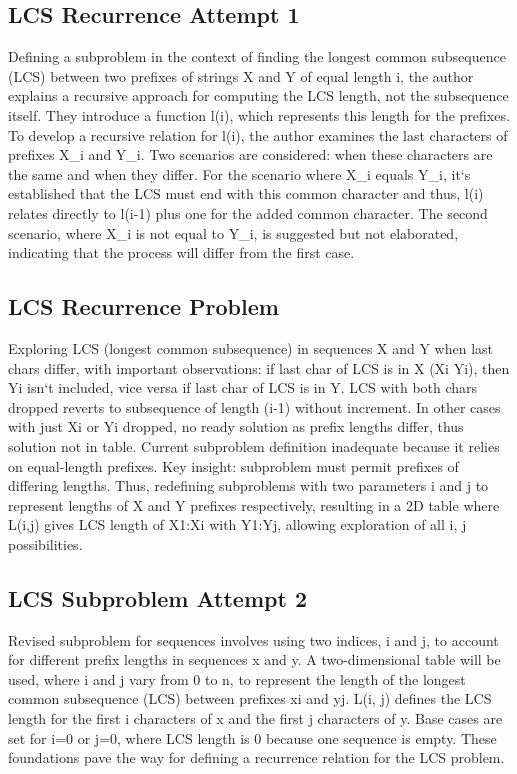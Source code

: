 \subsection*{LCS  Recurrence Attempt 1}
Defining a subproblem in the context of finding the longest common subsequence (LCS) between two prefixes of strings X and Y of equal length i, the author explains a recursive approach for computing the LCS length, not the subsequence itself.
They introduce a function l(i), which represents this length for the prefixes.
To develop a recursive relation for l(i), the author examines the last characters of prefixes X\_i and Y\_i.
Two scenarios are considered: when these characters are the same and when they differ.
For the scenario where X\_i equals Y\_i, it`s established that the LCS must end with this common character and thus, l(i) relates directly to l(i-1) plus one for the added common character.
The second scenario, where X\_i is not equal to Y\_i, is suggested but not elaborated, indicating that the process will differ from the first case.

\subsection*{LCS  Recurrence Problem}
Exploring LCS (longest common subsequence) in sequences X and Y when last chars differ, with important observations: if last char of LCS is in X (Xi  Yi), then Yi isn`t included, vice versa if last char of LCS is in Y\@.
LCS with both chars dropped reverts to subsequence of length (i-1) without increment.
In other cases with just Xi or Yi dropped, no ready solution as prefix lengths differ, thus solution not in table.
Current subproblem definition inadequate because it relies on equal-length prefixes.
Key insight: subproblem must permit prefixes of differing lengths.
Thus, redefining subproblems with two parameters i and j to represent lengths of X and Y prefixes respectively, resulting in a 2D table where L(i,j) gives LCS length of X1:Xi with Y1:Yj, allowing exploration of all i, j possibilities.

\subsection*{LCS  Subproblem Attempt 2}
Revised subproblem for sequences involves using two indices, i and j, to account for different prefix lengths in sequences x and y.
A two-dimensional table will be used, where i and j vary from 0 to n, to represent the length of the longest common subsequence (LCS) between prefixes xi and yj.
L(i, j) defines the LCS length for the first i characters of x and the first j characters of y.
Base cases are set for i=0 or j=0, where LCS length is 0 because one sequence is empty.
These foundations pave the way for defining a recurrence relation for the LCS problem.

